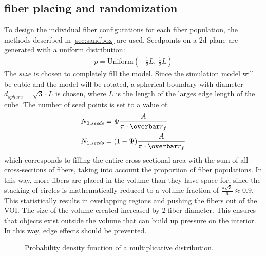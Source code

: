 \subsection{fiber placing and randomization}
% 
To design the individual fiber configurations for each fiber population, the methods described in \cref{sec:sandbox} are used.
Seedpoints on a 2d plane are generated with a uniform distribution:
\begin{align}
p = \mathrm{Uniform}(-\frac{1}{2}\mathit{L}, \, \frac{1}{2}\mathit{L})
\end{align}
The $\mathit{size}$ is chosen to completely fill the model.
Since the simulation model will be cubic and the model will be rotated, a spherical boundary with diameter $d_{\mathit{sphere}}=\sqrt{3} \cdot L$ is chosen, where $L$ is the length of the larges edge length of the cube.
The number of seed points is set to a value of. 
\begin{align}
N_{0,\mathit{seeds}} &= \Psi \frac{A}{\pi \cdot \fiberRadiusMean}\\
N_{1,\mathit{seeds}} &= (1-\Psi) \frac{A}{\pi \cdot \fiberRadiusMean}
\end{align}
which corresponds to filling the entire cross-sectional area with the sum of all cross-sections of fibers, taking into account the proportion of fiber populations.
In this way, more fibers are placed in the volume than they have space for, since the stacking of circles is mathematically reduced to a volume fraction of $\frac{\pi \sqrt{3}}{6} \approx 0.9$.
This statistically results in overlapping regions and pushing the fibers out of the \ac{VOI}.
The size of the volume created increased by 2 fiber diameter.
This ensures that objects exist outside the volume that can build up pressure on the interior.
In this way, edge effects should be prevented.
\par
% 
\begin{figure}[!t]
\centering
\tikzset{external/export=false}
\caption[]{ Probability density function of a multiplicative  distribution.}
\label{fig:logNormal}
\end{figure}
